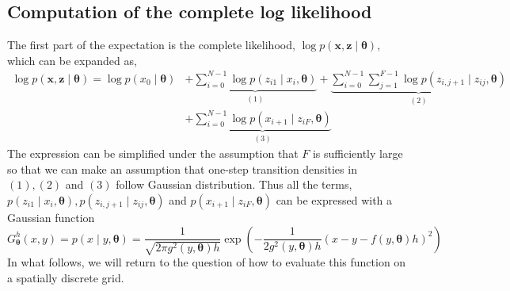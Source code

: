 \documentclass[12pt]{article}
\newcommand{\bx}{\ensuremath{\mathbf{x}}}
\newcommand{\bz}{\ensuremath{\mathbf{z}}}
\newcommand{\btheta}{\ensuremath{\boldsymbol{\theta}}}
\begin{document}
\subsection{Computation of the complete log likelihood}
\label{sect:loglik}
The first part of the expectation is the complete likelihood, $\log p(\bx, \bz \mid \btheta)$, which can be expanded as,
\begin{align}
\label{eqn:loglik}
\log p(\bx, \bz \mid \btheta) = \log p(x_0 \mid \btheta) & + \underbrace{\sum_{i=0}^{N-1} \log p(z_{i1} \mid x_i, \btheta)}_{(1)} + \underbrace{\sum_{i=0}^{N-1} \sum_{j=1}^{F-1} \log p(z_{i,j+1} \mid z_{ij}, \btheta)}_{(2)} \nonumber \\ 
& + \underbrace{\sum_{i=0}^{N-1} \log p(x_{i+1} \mid z_{iF}, \btheta)}_{(3)} 
\end{align}
The expression can be simplified under the assumption that $F$ is sufficiently large so that we can make an assumption that one-step transition densities in $(1), (2)$ and $(3)$ follow Gaussian distribution. Thus all the terms, $p(z_{i1} \mid x_i, \btheta), p(z_{i,j+1} \mid z_{ij}, \btheta)$ and $p(x_{i+1} \mid z_{iF}, \btheta)$ can be expressed with a Gaussian function
\begin{equation}
\label{eqn:gaussian}
G^h_{\btheta}(x,y) = p(x \mid y, \btheta) = \frac{1}{\sqrt{2 \pi g^2(y, \btheta)h}} \exp \left( - \frac{1}{2 g^2(y, \btheta)h} (x - y - f(y, \btheta)h)^2 \right)
\end{equation}
In what follows, we will return to the question of how to evaluate this function on a spatially discrete grid.
\end{document}

